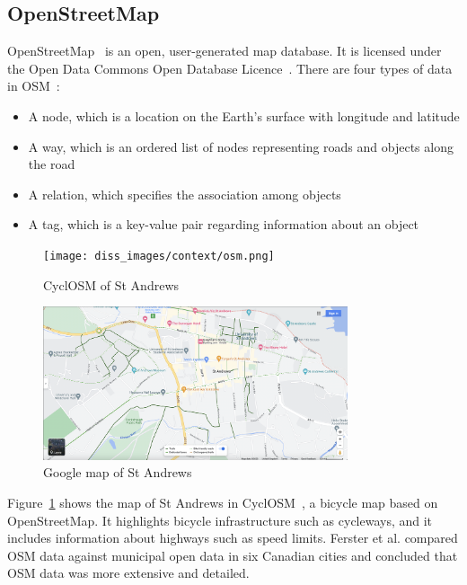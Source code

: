 \documentclass[12pt,a4paper]{report}
\begin{document}
\subsection{OpenStreetMap}
OpenStreetMap~\cite{OpenStreetMap} is an open, user-generated map database. It is licensed under the Open Data Commons Open Database Licence~\cite{odbl}. There are four types of data in OSM~\cite{9119753}:
\begin{itemize}
    \item A node, which is a location on the Earth's surface with longitude and latitude
    \item A way, which is an ordered list of nodes representing roads and objects along the road
    \item A relation, which specifies the association among objects
    \item A tag, which is a key-value pair regarding information about an object
\end{itemize}

\begin{figure}[ht!]
\centering
\texttt{[image: diss\_images/context/osm.png]}
\caption{CyclOSM of St Andrews}
\label{fig:osm_sta}
\end{figure}

\begin{figure}[ht!]
\centering
\includegraphics[width=0.8\textwidth,trim={10cm 0 10cm 5cm},clip]{diss_images/context/googlemap.png}
\caption{Google map of St Andrews}
\label{fig:google_sta}
\end{figure}

Figure~\ref{fig:osm_sta} shows the map of St Andrews in CyclOSM~\cite{cycleOSM}, a bicycle map based on OpenStreetMap. It highlights bicycle infrastructure such as cycleways, and it includes information about highways such as speed limits. Ferster et al. \cite{doi:10.1080/15568318.2018.1519746} compared OSM data against municipal open data in six Canadian cities and concluded that OSM data was more extensive and detailed.
\end{document}
